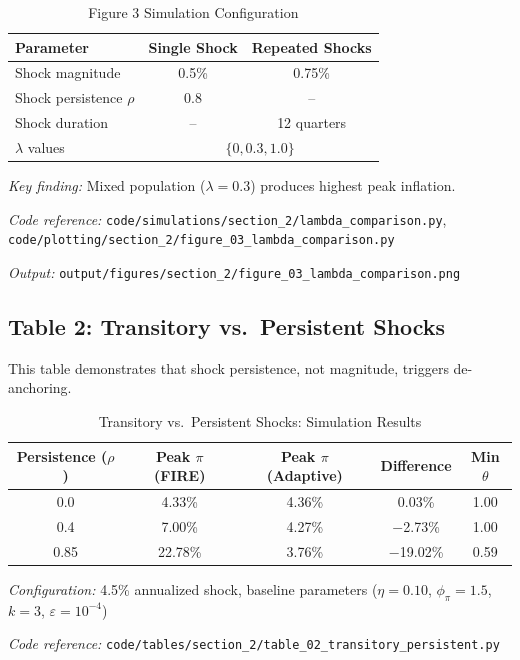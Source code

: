 \documentclass[11pt]{article}
\begin{document}
\begin{table}[htbp]
\centering
\caption{Figure 3 Simulation Configuration}
\label{tab:fig3_config}
\begin{threeparttable}
\begin{tabular}{lcc}
\toprule
Parameter & Single Shock & Repeated Shocks \\
\midrule
Shock magnitude & 0.5\% & 0.75\% \\
Shock persistence $\rho$ & 0.8 & -- \\
Shock duration & -- & 12 quarters \\
$\lambda$ values & \multicolumn{2}{c}{$\{0, 0.3, 1.0\}$} \\
\bottomrule
\end{tabular}
\begin{tablenotes}
\small
\item \textit{Key finding:} Mixed population ($\lambda = 0.3$) produces highest peak inflation.
\item \textit{Code reference:} \texttt{code/simulations/section\_2/lambda\_comparison.py}, \texttt{code/plotting/section\_2/figure\_03\_lambda\_comparison.py}
\item \textit{Output:} \texttt{output/figures/section\_2/figure\_03\_lambda\_comparison.png}
\end{tablenotes}
\end{threeparttable}
\end{table}

\subsection{Table 2: Transitory vs.\ Persistent Shocks}

This table demonstrates that shock persistence, not magnitude, triggers de-anchoring.

\begin{table}[htbp]
\centering
\caption{Transitory vs.\ Persistent Shocks: Simulation Results}
\label{tab:transitory_persistent}
\begin{threeparttable}
\begin{tabular}{ccccc}
\toprule
Persistence ($\rho$) & Peak $\pi$ (FIRE) & Peak $\pi$ (Adaptive) & Difference & Min $\theta$ \\
\midrule
0.0 & 4.33\% & 4.36\% & 0.03\% & 1.00 \\
0.4 & 7.00\% & 4.27\% & $-$2.73\% & 1.00 \\
0.85 & 22.78\% & 3.76\% & $-$19.02\% & 0.59 \\
\bottomrule
\end{tabular}
\begin{tablenotes}
\small
\item \textit{Configuration:} 4.5\% annualized shock, baseline parameters ($\eta = 0.10$, $\phi_\pi = 1.5$, $k = 3$, $\varepsilon = 10^{-4}$)
\item \textit{Code reference:} \texttt{code/tables/section\_2/table\_02\_transitory\_persistent.py}
\end{tablenotes}
\end{threeparttable}
\end{table}
\end{document}
